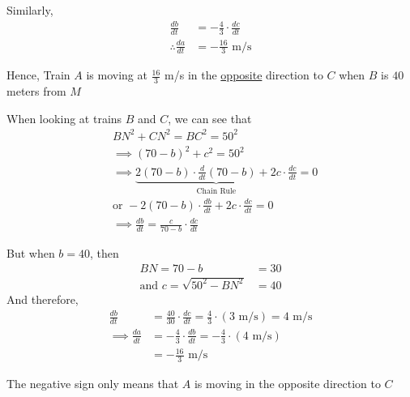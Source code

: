 \documentclass[14pt,fleqn]{extarticle}
\newcommand\dadt{\frac{da}{dt}}
\newcommand\dbdt{\frac{db}{dt}}
\newcommand\dcdt{\frac{dc}{dt}}
\begin{document}
\begin{question}
\begin{step}
\begin{options}
     Similarly, 
     \begin{align}
     \dbdt &= -\frac{4}{3}\cdot\dcdt \\
     \therefore \dadt &= -\frac{16}{3}\text{ m/s}
\end{align}  

Hence, Train $A$ is moving at $\frac{16}{3}$ m/s in the \underline{opposite} direction to $C$ when $B$ is $40$ meters from $M$
        
    \end{options} 
     \reason 
     
     When looking at trains $B$ and $C$, we can see that 
     \begin{align}
     &BN^2 + CN^2 = BC^2 = 50^2 \\
     &\implies (70-b)^2 + c^2 = 50^2 \\ 
     &\implies \underbrace{2\left(70-b \right)\cdot \frac{d}{dt} \left(70-b \right)
     + 2c\cdot\dcdt}_{\text{Chain Rule}} = 0 \\
     &\text{or } -2 \left(70-b \right)\cdot\dbdt + 2c\cdot\dcdt = 0 \\
     &\implies \dbdt = \frac{c}{70-b}\cdot\dcdt
\end{align}

But when $b = 40$, then 
\begin{align}
	BN = 70 -b &= 30 \\
	\text{and }c = \sqrt{50^2 - BN^2} &= 40
\end{align}
And therefore,
\begin{align}
\dbdt &= \frac{40}{30}\cdot\dcdt = \frac{4}{3}\cdot \left(3\text{ m/s} \right) = 4\text{ m/s} \\
\implies \dadt &= -\frac{4}{3}\cdot\dbdt = -\frac{4}{3}\cdot \left(4\text{ m/s} \right) \\
&= -\frac{16}{3}\text{ m/s}
\end{align}

The negative sign only means that $A$ is moving in the opposite direction to $C$

\end{step}

\end{question}
\end{document}
